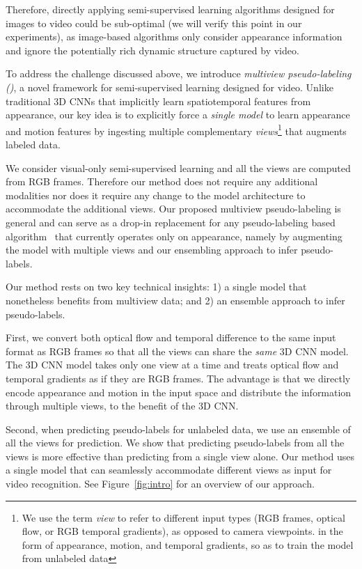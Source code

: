 \documentclass[10pt,twocolumn,letterpaper]{article}
\begin{document}
{Therefore,} directly applying semi-supervised learning algorithms designed for images to video could be sub-optimal (we will verify this point in our experiments), as image-based algorithms only consider appearance information and ignore the potentially rich dynamic structure captured by video. 

To address the challenge discussed above, we introduce \emph{multiview pseudo-labeling (\oursshort)}, a novel framework for semi-supervised learning {designed for} video. Unlike {traditional 3D CNNs} that implicitly learn spatiotemporal features from appearance,
our key idea is to {explicitly force a \emph{single model}} to learn appearance and motion {features} by {ingesting} multiple complementary \emph{views}\footnote{We use the term \emph{view} to refer to different input types (RGB frames, optical flow, or RGB temporal gradients), {as opposed to camera viewpoints.} in the form of  appearance, motion, and temporal gradients, {so as to} train the model from unlabeled data} {that augments labeled data.} 

We consider visual-only semi-supervised learning and all the views are computed from RGB frames.  
Therefore our method does not require any additional {modalities} nor {does it} require any change to the model architecture to {accommodate the additional views}.  
Our proposed multiview pseudo-labeling is general and can serve as a drop-in replacement for any pseudo-labeling based algorithm~\cite{lee2013pseudo, yalniz2019billion, Xie_2020_CVPR, fixmatch} that {currently} operates {only} on appearance, {namely} {by augmenting the model with multiple views and our ensembling approach to infer pseudo-labels.}




Our method
rests on two key technical insights: 1) a single model that nonetheless benefits from multiview data; and 2) an ensemble approach to infer pseudo-labels.  

First, we convert both optical flow  and temporal  difference to the same input format as RGB frames so that all the views can share the \emph{same} 3D CNN model.  The 3D CNN model takes only one view at a time and treats optical flow and temporal gradients as if they are RGB frames. The advantage 
is that we directly encode appearance and motion in the input space and distribute the information through multiple views, {to the benefit of the 3D CNN.}


Second,  when predicting pseudo-labels for unlabeled data, we use an ensemble of all the views for prediction. 
We show that predicting pseudo-labels from all the views {is} more effective than predicting from a single view alone. 
Our method uses a single model that can seamlessly accommodate different views as input for video recognition. 
See Figure~\ref{fig:intro} for an overview of our approach.
\end{document}
